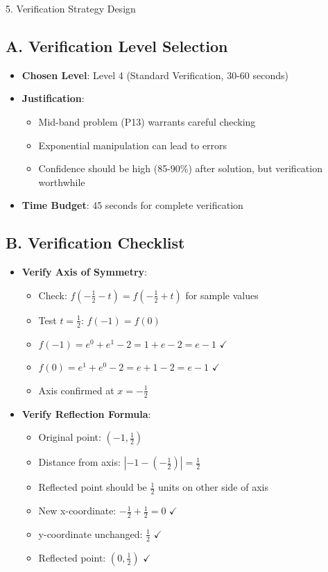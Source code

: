 \documentclass[12pt]{article}
\begin{document}
\begin{verificationbox}{5. Verification Strategy Design}

\subsection*{A. Verification Level Selection}
\begin{itemize}[leftmargin=*]
    \item \textbf{Chosen Level}: Level 4 (Standard Verification, 30-60 seconds)
    
    \item \textbf{Justification}: 
    \begin{itemize}
        \item Mid-band problem (P13) warrants careful checking
        \item Exponential manipulation can lead to errors
        \item Confidence should be high (85-90\%) after solution, but verification worthwhile
    \end{itemize}
    
    \item \textbf{Time Budget}: 45 seconds for complete verification
\end{itemize}

\subsection*{B. Verification Checklist}
\begin{itemize}[leftmargin=*]
    \item \textbf{Verify Axis of Symmetry}:
    \begin{itemize}
        \item Check: $f(-\frac{1}{2} - t) = f(-\frac{1}{2} + t)$ for sample values
        \item Test $t = \frac{1}{2}$: $f(-1) = f(0)$
        \item $f(-1) = e^0 + e^1 - 2 = 1 + e - 2 = e - 1$ $\checkmark$
        \item $f(0) = e^1 + e^0 - 2 = e + 1 - 2 = e - 1$ $\checkmark$
        \item Axis confirmed at $x = -\frac{1}{2}$
    \end{itemize}
    
    \item \textbf{Verify Reflection Formula}:
    \begin{itemize}
        \item Original point: $(-1, \frac{1}{2})$
        \item Distance from axis: $|-1 - (-\frac{1}{2})| = \frac{1}{2}$
        \item Reflected point should be $\frac{1}{2}$ units on other side of axis
        \item New x-coordinate: $-\frac{1}{2} + \frac{1}{2} = 0$ $\checkmark$
        \item y-coordinate unchanged: $\frac{1}{2}$ $\checkmark$
        \item Reflected point: $(0, \frac{1}{2})$ $\checkmark$
    \end{itemize}
    

\end{itemize}
\end{verificationbox}
\end{document}
